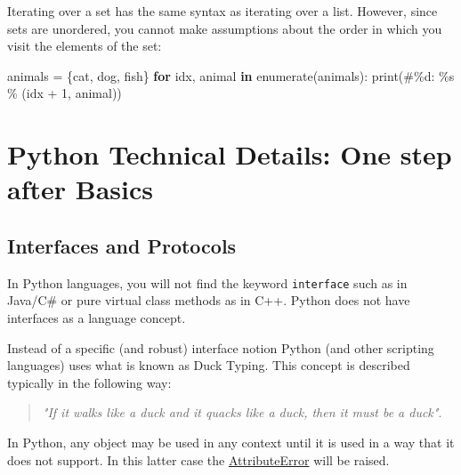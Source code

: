 \documentclass[
]{article}
\newenvironment{Shaded}{}{}
\newcommand{\BuiltInTok}[1]{#1}
\newcommand{\ControlFlowTok}[1]{\textcolor[rgb]{0.00,0.44,0.13}{\textbf{#1}}}
\newcommand{\DecValTok}[1]{\textcolor[rgb]{0.25,0.63,0.44}{#1}}
\newcommand{\KeywordTok}[1]{\textcolor[rgb]{0.00,0.44,0.13}{\textbf{#1}}}
\newcommand{\NormalTok}[1]{#1}
\newcommand{\OperatorTok}[1]{\textcolor[rgb]{0.40,0.40,0.40}{#1}}
\newcommand{\SpecialCharTok}[1]{\textcolor[rgb]{0.25,0.44,0.63}{#1}}
\newcommand{\StringTok}[1]{\textcolor[rgb]{0.25,0.44,0.63}{#1}}
\begin{document}
Iterating over a set has the same syntax as iterating over a list.
However, since sets are unordered, you cannot make assumptions about the
order in which you visit the elements of the set:

\begin{Shaded}
\begin{Highlighting}[]
\NormalTok{animals }\OperatorTok{=}\NormalTok{ \{}\StringTok{\textquotesingle{}cat\textquotesingle{}}\NormalTok{, }\StringTok{\textquotesingle{}dog\textquotesingle{}}\NormalTok{, }\StringTok{\textquotesingle{}fish\textquotesingle{}}\NormalTok{\}}
\ControlFlowTok{for}\NormalTok{ idx, animal }\KeywordTok{in} \BuiltInTok{enumerate}\NormalTok{(animals):}
    \BuiltInTok{print}\NormalTok{(}\StringTok{\textquotesingle{}\#}\SpecialCharTok{\%d}\StringTok{: }\SpecialCharTok{\%s}\StringTok{\textquotesingle{}} \OperatorTok{\%}\NormalTok{ (idx }\OperatorTok{+} \DecValTok{1}\NormalTok{, animal))}
\end{Highlighting}
\end{Shaded}

\hypertarget{python-technical-details-one-step-after-basics}{%
\section{Python Technical Details: One step after
Basics}\label{python-technical-details-one-step-after-basics}}

\hypertarget{interfaces-and-protocols}{%
\subsection{Interfaces and Protocols}\label{interfaces-and-protocols}}

In Python languages, you will not find the keyword \texttt{interface}
such as in Java/C\# or pure virtual class methods as in C++. Python does
not have interfaces as a language concept.

Instead of a specific (and robust) interface notion Python (and other
scripting languages) uses what is known as Duck Typing. This concept is
described typically in the following way:

\begin{quote}
\emph{"If it walks like a duck and it quacks like a duck, then it must
be a duck"}.
\end{quote}

In Python, any object may be used in any context until it is used in a
way that it does not support. In this latter case the
\href{\%0Ahttps://docs.python.org/3/library/exceptions.html\#AttributeError}{AttributeError}
will be raised.
\end{document}
